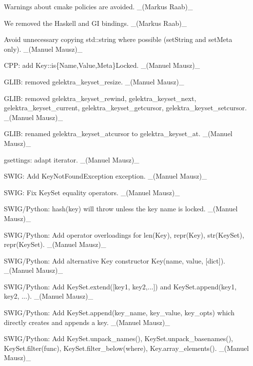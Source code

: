 \begin{DoxyItemize}
\item Warnings about cmake policies are avoided. \+\_\+(\+Markus Raab)\+\_\+
\item We removed the Haskell and GI bindings. \+\_\+(\+Markus Raab)\+\_\+
\item Avoid unnecessary copying std\+::string where possible (set\+String and set\+Meta only). \+\_\+(\+Manuel Mausz)\+\_\+
\item C\+PP\+: add {\ttfamily Key\+::is\{Name,Value,Meta\}Locked}. \+\_\+(\+Manuel Mausz)\+\_\+
\item G\+L\+IB\+: removed {\ttfamily gelektra\+\_\+keyset\+\_\+resize}. \+\_\+(\+Manuel Mausz)\+\_\+
\item G\+L\+IB\+: removed {\ttfamily gelektra\+\_\+keyset\+\_\+rewind}, {\ttfamily gelektra\+\_\+keyset\+\_\+next}, {\ttfamily gelektra\+\_\+keyset\+\_\+current}, {\ttfamily gelektra\+\_\+keyset\+\_\+getcursor}, {\ttfamily gelektra\+\_\+keyset\+\_\+setcursor}. \+\_\+(\+Manuel Mausz)\+\_\+
\item G\+L\+IB\+: renamed {\ttfamily gelektra\+\_\+keyset\+\_\+atcursor} to {\ttfamily gelektra\+\_\+keyset\+\_\+at}. \+\_\+(\+Manuel Mausz)\+\_\+
\item gsettings\+: adapt iterator. \+\_\+(\+Manuel Mausz)\+\_\+
\item S\+W\+IG\+: Add {\ttfamily Key\+Not\+Found\+Exception} exception. \+\_\+(\+Manuel Mausz)\+\_\+
\item S\+W\+IG\+: Fix Key\+Set equality operators. \+\_\+(\+Manuel Mausz)\+\_\+
\item S\+W\+I\+G/\+Python\+: {\ttfamily hash(key)} will throw unless the key name is locked. \+\_\+(\+Manuel Mausz)\+\_\+
\item S\+W\+I\+G/\+Python\+: Add operator overloadings for {\ttfamily len(\+Key)}, {\ttfamily repr(\+Key)}, {\ttfamily str(\+Key\+Set)}, {\ttfamily repr(\+Key\+Set)}. \+\_\+(\+Manuel Mausz)\+\_\+
\item S\+W\+I\+G/\+Python\+: Add alternative Key constructor {\ttfamily Key(name, value, \mbox{[}dict\mbox{]})}. \+\_\+(\+Manuel Mausz)\+\_\+
\item S\+W\+I\+G/\+Python\+: Add {\ttfamily Key\+Set.\+extend(\mbox{[}key1, key2,...\mbox{]})} and {\ttfamily Key\+Set.\+append(key1, key2, ...)}. \+\_\+(\+Manuel Mausz)\+\_\+
\item S\+W\+I\+G/\+Python\+: Add {\ttfamily Key\+Set.\+append(key\+\_\+name, key\+\_\+value, key\+\_\+opts)} which directly creates and appends a key. \+\_\+(\+Manuel Mausz)\+\_\+
\item S\+W\+I\+G/\+Python\+: Add {\ttfamily Key\+Set.\+unpack\+\_\+names()}, {\ttfamily Key\+Set.\+unpack\+\_\+basenames()}, {\ttfamily Key\+Set.\+filter(func)}, {\ttfamily Key\+Set.\+filter\+\_\+below(where)}, {\ttfamily Key.\+array\+\_\+elements()}. \+\_\+(\+Manuel Mausz)\+\_\+
\end{DoxyItemize}


